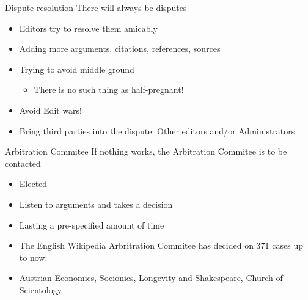 \documentclass{beamer}
\begin{document}
\begin{frame} {Dispute resolution}
	There will always be disputes
	\begin{itemize}
		\pause \item Editors try to resolve them amicably
		\pause \item Adding more arguments, citations, references, sources
		\pause \item Trying to avoid middle ground
			\begin{itemize}
				\pause \item There is no such thing as half-pregnant!
			\end{itemize}
		\pause \item Avoid Edit wars!
		\pause \item Bring third parties into the dispute: Other editors and/or Administrators
	\end{itemize}
\end{frame}

\begin{frame} {Arbitration Commitee}
	If nothing works, the Arbitration Commitee is to be contacted
	\begin{itemize}
		\pause \item Elected
		\pause \item Listen to arguments and takes a decision
		\pause \item Lasting a pre-specified amount of time
		\pause \item The English Wikipedia Arbritration Commitee has decided on 371 cases up to now:
		\pause \item Austrian Economics, Socionics, Longevity and Shakespeare, Church of Scientology
	\end{itemize}
\end{frame}
\end{document}
